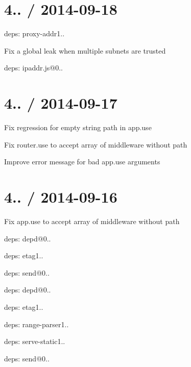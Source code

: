 \section*{4.. / 2014-\/09-\/18 }


\begin{DoxyItemize}
\item deps\+: proxy-\/addr1..
\begin{DoxyItemize}
\item Fix a global leak when multiple subnets are trusted
\item deps\+: ipaddr.\+js@0..
\end{DoxyItemize}
\end{DoxyItemize}

\section*{4.. / 2014-\/09-\/17 }


\begin{DoxyItemize}
\item Fix regression for empty string {\ttfamily path} in {\ttfamily app.\+use}
\item Fix {\ttfamily router.\+use} to accept array of middleware without path
\item Improve error message for bad {\ttfamily app.\+use} arguments
\end{DoxyItemize}

\section*{4.. / 2014-\/09-\/16 }


\begin{DoxyItemize}
\item Fix {\ttfamily app.\+use} to accept array of middleware without path
\item deps\+: depd@0..
\item deps\+: etag1..
\item deps\+: send@0..
\begin{DoxyItemize}
\item deps\+: depd@0..
\item deps\+: etag1..
\item deps\+: range-\/parser1..
\end{DoxyItemize}
\item deps\+: serve-\/static1..
\begin{DoxyItemize}
\item deps\+: send@0..
\end{DoxyItemize}
\end{DoxyItemize}

